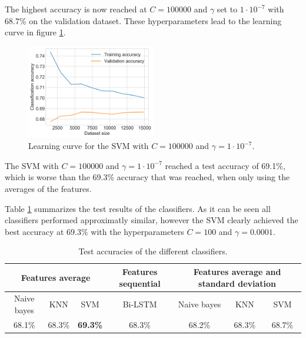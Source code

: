 The highest accuracy is now reached at $C=100000$ and $\gamma$ set to $1\cdot10^{-7}$ with 68.7\% on the validation dataset.
These hyperparameters lead to the learning curve in figure \ref{figure:svm_learning_std}.
\begin{figure}[h]
    \centering
    \includegraphics[width=0.5\textwidth]{figures/charts/training_with_std/svm_learning_curve.png}
    \caption{Learning curve for the \ac{SVM} with $C=100000$ and $\gamma=1\cdot10^{-7}$.}
    \label{figure:svm_learning_std}
\end{figure}
The \ac{SVM} with $C=100000$ and $\gamma=1\cdot10^{-7}$ reached a test accuracy of 69.1\%, which is worse than the 69.3\% accuracy that was reached, when only using the averages of the features.

Table \ref{table:test_results} summarizes the test results of the classifiers.
As it can be seen all classifiers performed approximatly similar, however the \ac{SVM} clearly achieved the best accuracy at 69.3\% with the hyperparameters $C=100$ and $\gamma=0.0001$.
\begin{table}[h]
    \begin{tabular}{ c | c | c || c || c | c | c }
        \multicolumn{3}{c||}{Features average} & Features sequential & \multicolumn{3}{c}{Features average and standard deviation} \\ \hline
        Naive bayes & KNN & SVM & Bi-LSTM & Naive bayes & KNN & SVM \\ \hline
        68.1\% & 68.3\% & \textbf{69.3\%} & 68.3\% & 68.2\% & 68.3\% & 68.7\% 
    \end{tabular}
    \caption{Test accuracies of the different classifiers.}
    \label{table:test_results}
\end{table}




